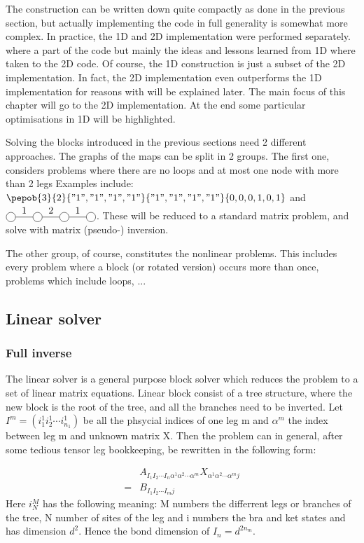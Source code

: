 The construction can be written down quite compactly as done in the previous section, but actually implementing the code in full generality is somewhat more complex. In practice, the 1D and 2D implementation were performed separately. where a part of the code but mainly the ideas and lessons learned from 1D where taken to the 2D code. Of course, the 1D construction is just a subset of the 2D implementation. In fact, the 2D implementation even outperforms the 1D implementation for reasons with will be explained later. The main focus of this chapter will go to the 2D implementation. At the end some particular optimisations in 1D will be highlighted.

Solving the blocks introduced in the previous sections need 2 different approaches. The graphs of the maps can be split in 2 groups. The first one, considers problems where there are no loops and at most one node with more than 2 legs Examples include:
$\pepob{3}{2}{{"1","1","1","1"}}{{"1","1","1","1"}}{{0,0,0,1,0,1}}$ and $\mpob{4}{ {,"1","2","1",}  }{}{}{}{{,,,,,}}$.
These will be reduced to a standard matrix problem, and solve with matrix (pseudo-) inversion.

The other group, of course, constitutes the nonlinear problems. This includes every problem where a block (or rotated version) occurs more than once, problems which include loops, ...

\subsection{Linear solver} \label{subsec:linear_solver}

\subsubsection{Full inverse}

The linear solver is a general purpose block solver which reduces the problem to a set of linear matrix equations. Linear block consist of a tree structure, where the new block is the root of the tree, and all the branches need to be inverted.  Let $ I^m = (i^1_1 i^1_2 \cdots i^1_{n_1})$ be all the phsycial indices of one leg m and $\alpha^m$ the index between leg m and unknown matrix X. Then the problem can in general, after some tedious tensor leg bookkeeping, be rewritten in the following form:

\begin{equation}
    \begin{split}
        &A_{ I_1  I_2 \cdots I_n \alpha^1 \alpha^2 \cdots \alpha^m   } X_{ \alpha^1 \alpha^2 \cdots \alpha^m j  } \\
        = &B_{  I_1  I_2 \cdots I_m   j }
    \end{split}
\end{equation}
Here $i^M_N$ has the following meaning: M numbers the differrent legs or branches of the tree, N number of sites of the leg and i numbers the bra and ket states and has dimension $d^2$. Hence the bond dimension of $I_n= d^{2 n_m }$.

